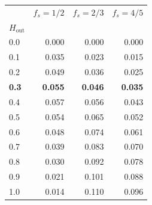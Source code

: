 \begin{tabular}{lrrr}
\toprule
 & $f_s=1/2$ & $f_s=2/3$ & $f_s=4/5$ \\
$H_{\text{out}}$ & & & \\
\midrule
0.0 & 0.000 & 0.000 & 0.000 \\
0.1 & 0.035 & 0.023 & 0.015 \\
0.2 & 0.049 & 0.036 & 0.025 \\
\textbf{0.3} & \textbf{0.055} & \textbf{0.046} & \textbf{0.035} \\
0.4 & 0.057 & 0.056 & 0.043 \\
0.5 & 0.054 & 0.065 & 0.052 \\
0.6 & 0.048 & 0.074 & 0.061 \\
0.7 & 0.039 & 0.083 & 0.070 \\
0.8 & 0.030 & 0.092 & 0.078 \\
0.9 & 0.021 & 0.101 & 0.088 \\
1.0 & 0.014 & 0.110 & 0.096 \\
\bottomrule
\end{tabular}
